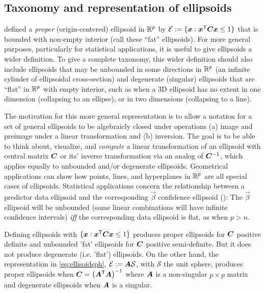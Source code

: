 \subsection{Taxonomy and representation of ellipsoids}\label{sec:taxonomy}
 defined a \emph{proper} (origin-centered) ellipsoid in  $\mathbb{R}^{p}$ by
$\mathcal{E} := \{ \bm{x}: \bm{x}^\mathsf{T} \bm{C} \bm{x} \le 1 \}$ that is bounded with non-empty interior (call these ``fat'' ellipsoids).
For more general purposes, particularly for statistical applications,
it is useful to give ellipsoids a wider definition.
To give a complete taxonomy, this wider definition should also include ellipsoids that may be unbounded in some directions in $\mathbb{R}^{p}$
(an infinite cylinder of ellipsoidal cross-section) and
degenerate (singular) ellipsoids that are ``flat'' in  $\mathbb{R}^{p}$ with empty interior, such as when a 3D ellipsoid has no extent in
one dimension (collapsing to an ellipse), or in two dimensions (collapsing to a line).

The motivation for this more general representation is to allow a notation for a set of general ellipsoids to be
algebraicly closed under operations (a) image and preimage under a linear transformation and (b) inversion.
The goal is to be able to think about, visualize, and \emph{compute} a linear transformation of an ellipsoid with central matrix
$\bm{C}$ or its' inverse transformation via an analog of $\bm{C}^{-1}$, which applies equally to unbounded
and/or degenerate ellipsoids. Geometrical applications can show how points, lines, and hyperplanes 
in  $\mathbb{R}^{p}$ are all special cases of ellipsoids.
Statistical applications concern the relationship between a predictor data ellipsoid and the
corresponding $\vec{\beta}$ confidence ellipsoid (): The $\vec{\beta}$ ellipsoid will be unbounded (some linear combinations
will have infinite confidence intervals) \emph{iff} the corresponding data ellipsoid is flat, as when $p>n$.

Defining ellipsoids with $\{ \bm{x}: \bm{x}^\mathsf{T} \bm{C} \bm{x} \le 1 \}$ produces proper ellipsoids for $\bm{C}$
positive definite and unbounded 'fat' ellipsoids for $\bm{C}$ positive semi-definite.
But it does not produce degenerate (i.e. 'flat') ellipsoids.  On the other hand,
the representation in \eqref{eq:ellisoidsph},
$\mathcal{E} := \bm{A} \mathcal{S}$, with $\mathcal{S}$ the unit sphere,
 produces proper ellipsoids when $\bm{C} = \left( \bm{A} ^\mathsf{T} \bm{A} \right)^{-1}$
where $\bm{A}$ is a non-singular $p \times p$ matrix and degenerate ellipsoids when $\bm{A}$ is a singular.

